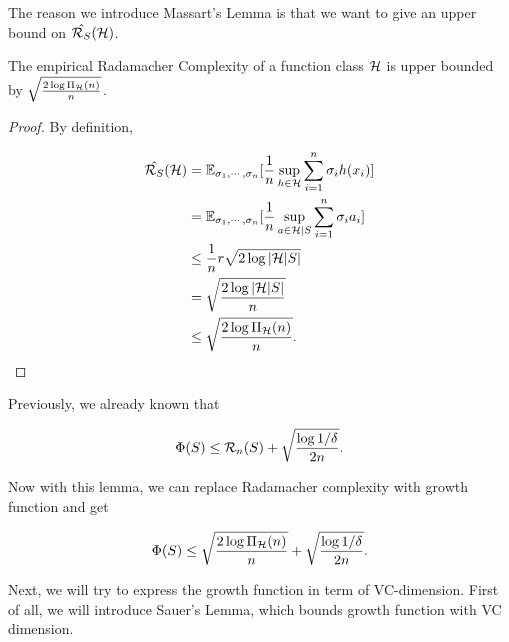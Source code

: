 \documentclass[../main.tex]{subfiles}
\begin{document}
	The reason we introduce Massart's Lemma is that we want to give an upper bound on $\hat{\mathcal{R}_S}(\mathcal{H})$.
		
	\begin{claim}
		The empirical Radamacher Complexity of a function class $\mathcal{H}$ is upper bounded by $\sqrt{\frac{2\log \Pi_{\mathcal{H}} (n)}{n}}$.
	\end{claim}

	\begin{proof}
		
		By definition,
		
		\begin{equation*}
			\begin{aligned}
				\hat{\mathcal{R}_S}(\mathcal{H}) & = \mathbb{E}_{\sigma_1,\cdots,\sigma_n } [\frac{1}{n} \sup\limits_{h\in \mathcal{H}} \sum\limits_{i=1}^n \sigma_i h(x_i)] \\
								& = \mathbb{E}_{\sigma_1,\cdots,\sigma_n } [\frac{1}{n} \sup\limits_{a \in \mathcal{H}|S} \sum\limits_{i=1}^n \sigma_i a_i] \\
								& \leq \frac{1}{n} r \sqrt{2\log |\mathcal{H}|S|} \\ 
								& = \sqrt{ \frac{2\log |\mathcal{H}|S|}{n}}   \\
								& \leq \sqrt{\frac{2\log \Pi_{\mathcal{H}}(n)}{n}}.
			\end{aligned}
		\end{equation*}
	\end{proof}
		
		
		Previously, we already known that 
		
		\begin{equation*}
			\begin{aligned}
				\Phi(S) \leq \mathcal{R}_n(S) + \sqrt{\frac{\log 1 / \delta}{2n}}.
			\end{aligned}
		\end{equation*}
		
		Now with this lemma, we can replace Radamacher complexity with growth function and get
		
		\begin{equation*}
			\begin{aligned}
				\Phi(S) \leq \sqrt{\frac{2\log \Pi_{\mathcal{H}}(n)}{n}} + \sqrt{\frac{\log 1 / \delta}{2n}}.
			\end{aligned}
		\end{equation*}
		
		
		Next, we will try to express the growth function in term of VC-dimension. First of all, we will introduce Sauer's Lemma, which bounds growth function with VC dimension.
		
\end{document}
